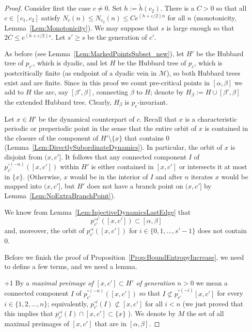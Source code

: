 \documentclass[12pt]{amsart}
\newcommand{\M}{\mathscr M}
\newcommand{\sm}{\setminus}
\newcommand{\0}{\texttt{0}}
\newcommand{\1}{\texttt{1}}
\newcommand\eps{\varepsilon}
\theoremstyle{definition}
\numberwithin{equation}{section}
\begin{document}
\begin{proof}
Consider first the case $c\not =0$. Set $h:=\tilde h(c_2)$. There is a $C>0$ so that all $c\in [c_1,c_2]$ satisfy $N_c(n)\le N_{c_2}(n)\le Ce^{(h+\eps/2)n}$ for all $n$ (monotonicity, Lemma~\ref{Lem:Monotonicity}). We may suppose that $s$ is large enough so that $2C\le e^{(h+\eps/2)s}$. Let $s'\ge s$ be the generation of $c'$. 

As before (see Lemma~\ref{Lem:MarkedPointsSubset_new}), let $H'$ be the Hubbard tree of $p_{c'}$, which is dyadic, and let $H$ be the Hubbard tree of $p_c$, which is postcritically finite (as endpoint of a dyadic vein in $\M$), so both Hubbard trees exist and are finite. Since in this proof we count pre-critical points in $[\alpha,\beta]$ we add to $H$ the arc, say $[\beta',\beta]$,  connecting $\beta$ to $H$; denote by 
$H_\beta:= H\cup [\beta',\beta]$ the extended Hubbard tree. Clearly, $H_\beta$ is $p_c$-invariant.

Let $x\in H'$ be the dynamical counterpart of $c$. Recall that $x$ is a characteristic periodic or preperiodic point in the sense that the entire orbit of $x$ is contained in the closure of the component of $H'\sm\{x\}$ that contains $0$ (Lemma~\ref{Lem:DirectlySubordinateDynamics}). 
In particular, the orbit of $x$ is disjoint from $(x,c']$. It follows that any connected component $I$ of $p_{c'}^{\circ (-n)}([x,c'])$ within $H'$ is either contained in $[x,c']$ or intersects it at most in $\{x\}$. (Otherwise, $x$ would be in the interior of $I$ and after $n$ iterates $x$ would be mapped into $(x,c']$, but $H'$ does not have a branch point on $(x,c']$ by Lemma~\ref{Lem:NoExtraBranchPoint}).


We know from Lemma~\ref{Lem:InjectiveDynamicsLastEdge} that
\begin{equation}
p_{c'}^{\circ s'}([x,c']) \subset[\alpha,\beta]
\label{Eq:IterateOf[x,ctilde]}
\end{equation}
and, moreover, the orbit of $p_{c'}^{\circ i}([x,c'])$ for $i\in \{0,1,\dots , s'-1\}$ does not contain $0$.

Before we finish the proof of Proposition~\ref{Prop:BoundEntropyIncrease}, we need to define a few terms, and we need a lemma. 

\looseness+1
By a \emph{maximal preimage of $[x,c'] \subset H'$ of generation $n>0$} we 
mean a connected component $I$ of $p_{c'}^{\circ (-n)}([x,c'])$ so that $I\not\subset p_{c'}^{\circ(-i)}[x,c']$
for every $i\in\{1,2,\dots,n\}$; equivalently, $p_{c'}^{\circ i}(I)\not \subset [x,c']$ for all $i<n$ {(we just proved that this implies that  $p_{c'}^{\circ i}(I)\cap[x,c']\subset\{x\}$} ). 
We denote by $M$ the set of all maximal preimages of $[x,c']$ that are in $[\alpha,\beta]$.



\end{proof}
\end{document}
